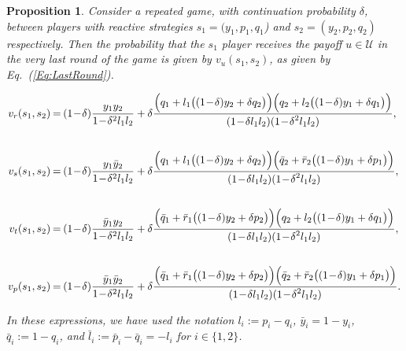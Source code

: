 \documentclass[11pt]{article}
\theoremstyle{plainCl1}
\newtheorem{Prop}{Proposition}
\theoremstyle{plainCl2}
\begin{document}
\begin{Prop}\label{proposition:last_round} Consider a repeated game, with
    continuation probability $\delta$, between players with reactive strategies
    $s_1\!=\!(y_1, p_1, q_1$)  and $s_2\!=\!(y_2,p_2,q_2)$ respectively. Then
    the probability that the $s_1$ player receives the payoff $u\!\in\!
    \mathcal{U}$ in the very last round of the game is given by
    $v_{u}(s_1,s_2)$, as given by Eq.~(\ref{Eq:LastRound}).

    \begin{equation} \label{Eq:LastRound}
      \setlength{\arraycolsep}{1pt}
      \begin{array}{rcl}
    
      v_{r}(s_1,s_2) &= &\displaystyle (1\!-\!\delta)\frac{y_1y_2}{1\!-\!\delta^2 l_1 l_2}+\delta \frac{\Big(q_1+l_1\big((1\!-\!\delta)y_2+\delta q_2\big)\Big) \Big(q_2+l_2\big((1\!-\!\delta)y_1+\delta q_1\big)\Big)}
      {\displaystyle(1\!-\!\delta l_1l_2)(1\!-\!\delta^2 l_1 l_2)},\\[1cm]
    
      v_{s}(s_1,s_2) &= &\displaystyle (1\!-\!\delta)\frac{y_1\bar{y}_2}{1\!-\!\delta^2 l_1 l_2}+\delta \frac{\Big(q_1+l_1\big((1\!-\!\delta)y_2+\delta q_2\big)\Big) \Big(\bar{q}_2+\bar{r}_2\big((1\!-\!\delta)y_1+\delta p_1\big)\Big)}
      {\displaystyle(1\!-\!\delta l_1l_2)(1\!-\!\delta^2 l_1 l_2)},\\[1cm]
    
      v_{t}(s_1,s_2) &= &\displaystyle (1\!-\!\delta)\frac{\bar{y}_1y_2}{1\!-\!\delta^2 l_1 l_2}+\delta \frac{\Big(\bar{q}_1+\bar{r}_1\big((1\!-\!\delta)y_2+\delta p_2\big)\Big) \Big(q_2+l_2\big((1\!-\!\delta)y_1+\delta q_1\big)\Big)}
      {\displaystyle(1\!-\!\delta l_1l_2)(1\!-\!\delta^2 l_1 l_2)},\\[1cm]
    
      v_{p}(s_1,s_2) &= &\displaystyle (1\!-\!\delta)\frac{\bar{y}_1\bar{y}_2}{1\!-\!\delta^2 l_1 l_2}+\delta \frac{\Big(\bar{q}_1+\bar{r}_1\big((1\!-\!\delta)y_2+\delta p_2\big)\Big) \Big(\bar{q}_2+\bar{r}_2\big((1\!-\!\delta)y_1+\delta p_1\big)\Big)}
      {\displaystyle(1\!-\!\delta l_1l_2)(1\!-\!\delta^2 l_1 l_2)}.
      \end{array}
    \end{equation}

In these expressions, we have used the notation $l_i:=p_i\!-\!q_i$,
$\bar{y}_i\!=\!1\!-\!y_i$, $\bar{q}_i:=1\!-\!q_i$, and
$\bar{l}_i:=\bar{p}_i\!-\!\bar{q}_i=-l_i$ for $i\!\in\!\{1,2\}$.
\end{Prop}
\end{document}
